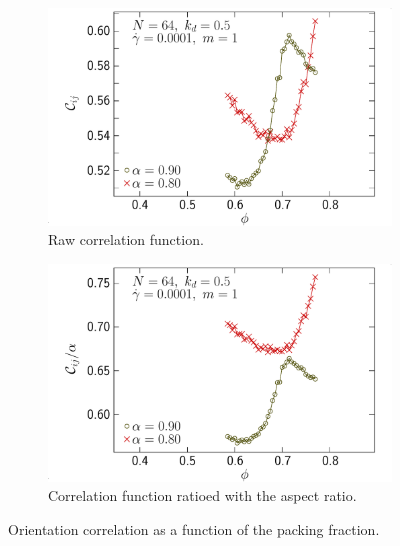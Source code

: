 \documentclass[class=report, float=false, crop=false]{standalone}
\begin{document}
\begin{figure}[h!]
\centering
    \begin{subfigure}[t]{0.49\textwidth}
        \centering
        \includegraphics[width=\textwidth]{figures/figs/orij_phi_oblate_0064_KDk500_Ml100_GDh100}
        \caption{Raw correlation function.}
        \label{orij_phi_oblate_0064_KDk500_Ml100_GDh100}
    \end{subfigure}
    \hfill
    \begin{subfigure}[t]{0.49\textwidth}
        \centering
        \includegraphics[width=\textwidth]{figures/figs/orijal_phi_oblate_0064_KDk500_Ml100_GDh100}
        \caption{Correlation function ratioed with the aspect ratio.}
        \label{orijal_phi_oblate_0064_KDk500_Ml100_GDh100}
    \end{subfigure}
    \caption{Orientation correlation as a function of the packing fraction.}
    \label{orij_phi_ob_0064}
\end{figure}
\end{document}
